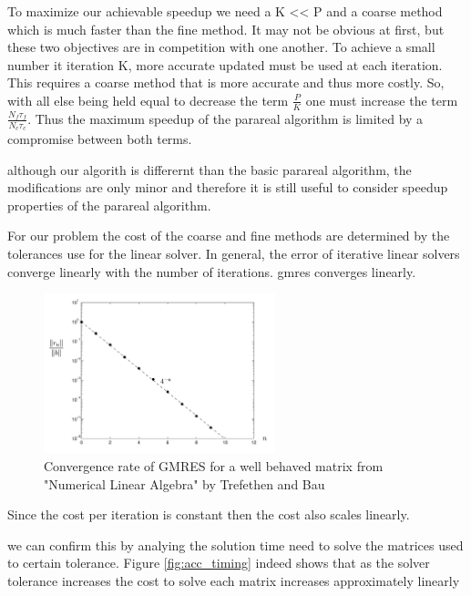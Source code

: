 \documentclass[conf]{new-aiaa}
\begin{document}
To maximize our achievable speedup we need a K << P and a coarse method which is much faster than the fine method.
It may not be obvious at first, but these two objectives are in competition with one another.
To achieve a small number it iteration K, more accurate updated must be used at each iteration.
This requires a coarse method that is more accurate and thus more costly.
So, with all else being held equal to decrease the term $\frac{P}{K}$ one must increase the term $ \frac{N_{f} \tau_{f}}{N_{c} \tau_{c}} $.
Thus the maximum speedup of the parareal algorithm is limited by a compromise between both terms.



although our algorith is differernt than the basic parareal algorithm, the modifications are only minor and therefore it is still useful to consider speedup properties of the parareal algorithm.

For our problem the cost of the coarse and fine methods are determined by the tolerances use for the linear solver.
In general, the error of iterative linear solvers converge linearly with the number of iterations.
gmres converges linearly.

\begin{figure}[H]
	\centering
	\includegraphics[width=0.60\textwidth,keepaspectratio]{gmres_conv.png}
	\caption{Convergence rate of GMRES for a well behaved matrix from "Numerical Linear Algebra" by Trefethen and Bau}
	\label{fig:gmres_conv}
\end{figure}

Since the cost per iteration is constant then the cost also scales linearly.




we can confirm this by analying the solution time need to solve the matrices used to certain tolerance.
Figure \ref{fig:acc_timing} indeed shows that as the solver tolerance increases the cost to solve each matrix increases approximately linearly
\end{document}
